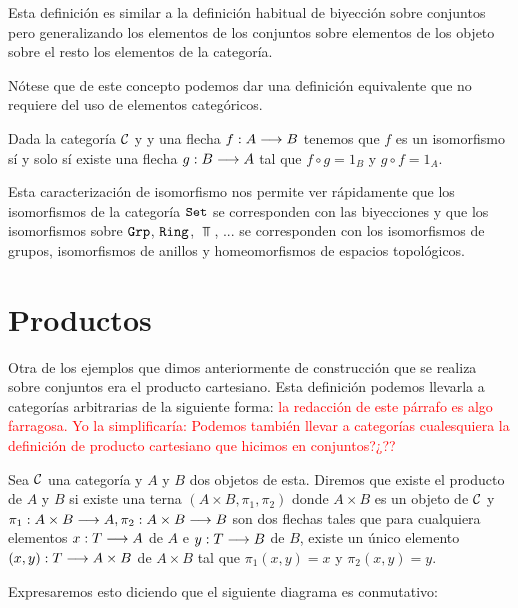 Esta definición es similar a la definición habitual
de biyección sobre conjuntos pero generalizando los elementos de
los conjuntos sobre elementos de los objeto sobre el resto los elementos
de la categoría.

Nótese que de este concepto podemos dar una definición equivalente
que no requiere del uso de elementos categóricos.

\begin{proposition}
Dada la categoría $\mathcal{C}$ y y una flecha $f: A\longrightarrow B$ tenemos que
$f$ es un isomorfismo sí y solo sí existe una flecha $g: B\longrightarrow A$
tal que $f \circ g = 1_B$ y $g \circ f = 1_A$.
\end{proposition}


Esta caracterización de isomorfismo nos permite ver rápidamente
que los isomorfismos de la categoría $\texttt{Set}$ se corresponden con las
biyecciones y que los isomorfismos sobre $\texttt{Grp}$, $\texttt{Ring}$, $\Top$, ...
se corresponden con los isomorfismos de grupos,
isomorfismos de anillos y homeomorfismos de espacios topológicos.


\section{Productos}
Otra de los ejemplos que dimos anteriormente de construcción que
se realiza sobre conjuntos era el producto cartesiano. Esta definición
podemos llevarla a categorías arbitrarias de la siguiente forma: \textcolor{red}{la redacción de este párrafo es algo farragosa. Yo la simplificaría: Podemos también llevar a categorías cualesquiera la definición de producto cartesiano que hicimos en conjuntos?¿??}

\begin{definition}
Sea $\mathcal{C}$ una categoría y $A$ y $B$ dos objetos de esta. Diremos que
existe el producto de $A$ y $B$ si
existe una terna $(A\times B, \pi_1, \pi_2)$
donde $A\times B$ es un objeto de $\mathcal{C}$ y
$\pi_1 : A\times B\longrightarrow A, \pi_2 : A\times B\longrightarrow B$ son dos flechas tales
que para cualquiera elementos $x : T\longrightarrow A$ de $A$ e
$y: T\longrightarrow B$ de $B$, existe un único elemento
$(x,y): T\longrightarrow A\times B$ de $A\times B$ tal que $\pi_1 (x,y)=x$ y $\pi_2(x,y)=y$.

Expresaremos esto diciendo que  el siguiente diagrama es conmutativo:
\begin{center}
\end{center}

\end{definition}

